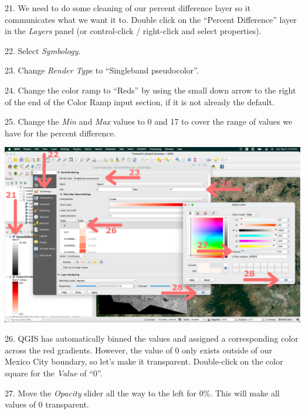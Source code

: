 \documentclass[oneside,a4paper,11pt,explicit]{book}
\begin{document}

21. We need to do some cleaning of our percent difference layer so it communicates what we want it to. Double click on the ``Percent Difference'' layer in the \textit{Layers} panel (or control-click / right-click and select properties). 

22. Select \textit{Symbology}.

23. Change \textit{Render Type} to ``Singleband pseudocolor''. 

24. Change the color ramp to ``Reds'' by using the small down arrow to the right of the end of the Color Ramp input section, if it is not already the default. 

25. Change the \textit{Min} and \textit{Max} values to 0 and 17 to cover the range of values we have for the percent difference. 

\centerline{\includegraphics[width=\textwidth]{PercentDifferenceLayer.png}}

\vspace{.5em}

26. QGIS has automatically binned the values and assigned a corresponding color across the red gradients. However, the value of 0 only exists outside of our Mexico City boundary, so let's make it transparent. Double-click on the color square for the \textit{Value} of ``0''.

27. Move the \textit{Opacity} slider all the way to the left for 0\%. This will make all values of 0 transparent.
\end{document}
